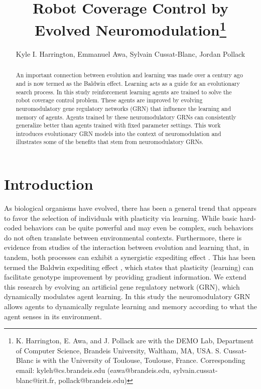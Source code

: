 \documentclass[conference]{IEEEtran}
\begin{document}
\title{\ \\ \LARGE\bf Robot Coverage Control by Evolved
Neuromodulation\thanks{K. Harrington, E. Awa, and J. Pollack are with the
DEMO Lab, Department of Computer Science, Brandeis University, Waltham, MA, USA.
S. Cussat-Blanc is with the University of Toulouse, Toulouse, France. Corresponding
email: kyleh@cs.brandeis.edu (eawa@brandeis.edu, sylvain.cussat-blanc@irit.fr, pollack@brandeis.edu)}}

\author{Kyle I. Harrington, Emmanuel Awa, Sylvain Cussat-Blanc, Jordan Pollack}

\date{}

\maketitle

\begin{abstract}
An important connection between evolution and learning was made over a century
ago and is now termed as the Baldwin effect. Learning acts as a guide for an
evolutionary search process. In this study reinforcement learning agents are
trained to solve the robot coverage control problem. These agents are improved
by evolving neuromodulatory gene regulatory networks (GRN) that influence the
learning and memory of agents. Agents trained by these neuromodulatory GRNs can
consistently generalize better than agents trained with fixed parameter
settings. This work introduces evolutionary GRN models into the context of
neuromodulation and illustrates some of the benefits that stem from
neuromodulatory GRNs.
\end{abstract}

\section{Introduction}

As biological organisms have evolved, there has been a general trend that
appears to favor the selection of individuals with plasticity via learning.
While basic hard-coded behaviors can be quite powerful and may even be complex,
such behaviors do not often translate between environmental contexts.
Furthermore, there is evidence from studies of the interaction between evolution
and learning that, in tandem, both processes can exhibit a synergistic
expediting effect \cite{hinton1987learning, Ancel2000}. This has been termed the
Baldwin expediting effect \cite{Baldwin1896}, which states that plasticity (learning) can
facilitate genotype improvement by providing gradient information. We extend
this research by evolving an artificial gene regulatory network (GRN), which
dynamically modulates agent learning. In this study the neuromodulatory GRN
allows agents to dynamically regulate learning and memory according to what the
agent senses in its environment.
\end{document}
